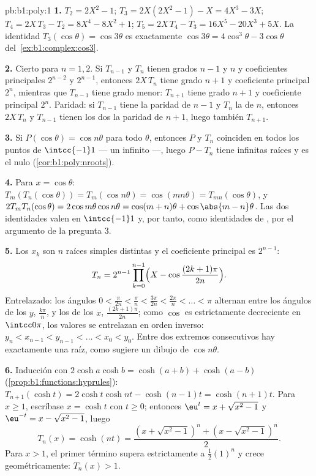 \begin{solution}{pb:b1:poly:1}
\textbf{1.} $T_2 = 2X^2 - 1$; $T_3 = 2X(2X^2 - 1) - X = 4X^3 - 3X$;
$T_4 = 2X\,T_3 - T_2 = 8X^4 - 8X^2 + 1$;
$T_5 = 2X\,T_4 - T_3 = 16X^5 - 20X^3 + 5X$. La identidad
$T_3(\cos\theta) = \cos3\theta$ es exactamente
$\cos3\theta = 4\cos^3\theta - 3\cos\theta$
del~\cref{ex:b1:complex:cos3}.

\textbf{2.} Cierto para $n = 1, 2$. Si $T_{n-1}$ y $T_n$ tienen grados
$n-1$ y $n$ y coeficientes principales $2^{n-2}$ y $2^{n-1}$, entonces
$2X\,T_n$ tiene grado $n+1$ y coeficiente principal $2^n$, mientras que
$T_{n-1}$ tiene grado menor: $T_{n+1}$ tiene grado $n + 1$ y
coeficiente principal $2^n$. Paridad: si $T_{n-1}$ tiene la paridad de
$n - 1$ y $T_n$ la de $n$, entonces $2X\,T_n$ y $T_{n-1}$ tienen los
dos la paridad de $n + 1$, luego también $T_{n+1}$.

\textbf{3.} Si $P(\cos\theta) = \cos n\theta$ para todo $\theta$,
entonces $P$ y $T_n$ coinciden en todos los puntos de $\intcc{-1}1$
--- un  infinito ---, luego $P - T_n$ tiene infinitas raíces y
es el  nulo (\cref{cor:b1:poly:nroots}).

\textbf{4.} Para $x = \cos\theta$: $T_m(T_n(\cos\theta)) =
T_m(\cos n\theta) = \cos(mn\theta) = T_{mn}(\cos\theta)$, y
$2T_mT_n(\cos\theta) = 2\cos m\theta\cos n\theta = \cos(m+n)\theta
+ \cos\abs{m - n}\theta$. Las dos identidades valen en $\intcc{-1}1$
y, por tanto, como identidades de , por el argumento de la
pregunta 3.

\textbf{5.} Los $x_k$ son $n$ raíces simples distintas y el coeficiente
principal es $2^{n-1}$:
\[
T_n = 2^{n-1}\prod_{k=0}^{n-1}
\Bigl(X - \cos\frac{(2k+1)\pi}{2n}\Bigr) .
\]
Entrelazado: los ángulos $0 < \frac{\pi}{2n} < \frac\pi n <
\frac{3\pi}{2n} < \frac{2\pi}n < \dots < \pi$ alternan entre los
ángulos de los $y$, $\frac{k\pi}n$, y los de los $x$,
$\frac{(2k+1)\pi}{2n}$; como $\cos$ es estrictamente decreciente en
$\intcc0\pi$, los valores se entrelazan en orden inverso:
$y_n < x_{n-1} < y_{n-1} < \dots < x_0 < y_0$. Entre dos extremos
consecutivos hay exactamente una raíz, como sugiere un dibujo de
$\cos n\theta$.

\textbf{6.} Inducción con $2\cosh a\cosh b = \cosh(a + b) +
\cosh(a - b)$ (\cref{prop:b1:functions:hyprules}):
$T_{n+1}(\cosh t) = 2\cosh t\cosh nt - \cosh(n-1)t = \cosh(n+1)t$. Para
$x \geq 1$, escríbase $x = \cosh t$ con $t \geq 0$; entonces
$\eu^t = x + \sqrt{x^2 - 1}$ y $\eu^{-t} = x - \sqrt{x^2 - 1}$, luego
\[
T_n(x) = \cosh(nt)
= \frac{(x + \sqrt{x^2-1})^n + (x - \sqrt{x^2-1})^n}2 .
\]
Para $x > 1$, el primer término supera estrictamente a
$\frac12(1)^n$ y crece geométricamente: $T_n(x) > 1$.


\end{solution}
